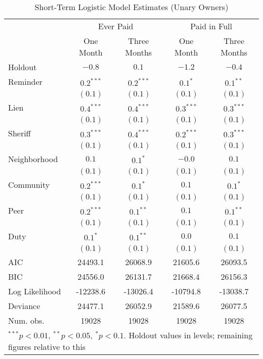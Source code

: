\documentclass[12pt]{article}
\begin{document}
\begin{appendix}
\begin{table}[htbp]
\caption{Short-Term Logistic Model Estimates (Unary Owners)}\label{sh_logit}
\begin{center}
\begin{tabular}{l c c c c }
\hline
 & \multicolumn{2}{c}{Ever Paid} & \multicolumn{2}{c}{Paid in Full} \\
 & One Month & Three Months & One Month & Three Months \\
Holdout        & $-0.8$ & $0.1$       & $-1.2$ & $-0.4$ \\
\hline
Reminder        & $0.2^{***}$  & $0.2^{***}$ & $0.1^{*}$    & $0.1^{**}$   \\
               & $(0.1)$      & $(0.1)$     & $(0.1)$      & $(0.1)$      \\
Lien           & $0.4^{***}$  & $0.4^{***}$ & $0.3^{***}$  & $0.3^{***}$  \\
               & $(0.1)$      & $(0.1)$     & $(0.1)$      & $(0.1)$      \\
Sheriff        & $0.3^{***}$  & $0.4^{***}$ & $0.2^{***}$  & $0.3^{***}$  \\
               & $(0.1)$      & $(0.1)$     & $(0.1)$      & $(0.1)$      \\
Neighborhood   & $0.1$        & $0.1^{*}$   & $-0.0$       & $0.1$        \\
               & $(0.1)$      & $(0.1)$     & $(0.1)$      & $(0.1)$      \\
Community      & $0.2^{***}$  & $0.1^{*}$   & $0.1$        & $0.1^{*}$    \\
               & $(0.1)$      & $(0.1)$     & $(0.1)$      & $(0.1)$      \\
Peer           & $0.2^{***}$  & $0.1^{**}$  & $0.1$        & $0.1^{**}$   \\
               & $(0.1)$      & $(0.1)$     & $(0.1)$      & $(0.1)$      \\
Duty           & $0.1^{*}$    & $0.1^{**}$  & $0.0$        & $0.1$        \\
               & $(0.1)$      & $(0.1)$     & $(0.1)$      & $(0.1)$      \\
\hline
AIC            & 24493.1      & 26068.9     & 21605.6      & 26093.5      \\
BIC            & 24556.0      & 26131.7     & 21668.4      & 26156.3      \\
Log Likelihood & -12238.6     & -13026.4    & -10794.8     & -13038.7     \\
Deviance       & 24477.1      & 26052.9     & 21589.6      & 26077.5      \\
Num. obs.      & 19028        & 19028       & 19028        & 19028        \\
\hline
\multicolumn{5}{l}{\scriptsize{$^{***}p<0.01$, $^{**}p<0.05$,
    $^*p<0.1$. Holdout values in levels; remaining figures relative to
    this}}
\end{tabular}
\end{center}
\end{table}


\end{appendix}
\end{document}
